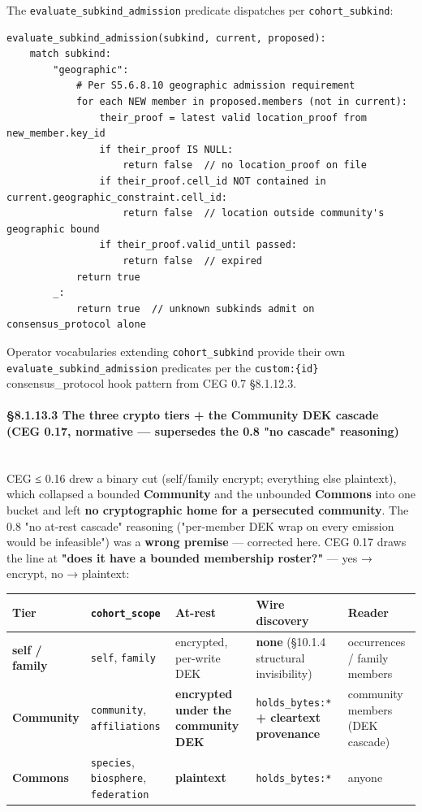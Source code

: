 \documentclass[11pt]{article}
\begin{document}
The \texttt{evaluate\_subkind\_admission} predicate dispatches per \texttt{cohort\_subkind}:


\begin{lstlisting}
evaluate_subkind_admission(subkind, current, proposed):
    match subkind:
        "geographic":
            # Per S5.6.8.10 geographic admission requirement
            for each NEW member in proposed.members (not in current):
                their_proof = latest valid location_proof from new_member.key_id
                if their_proof IS NULL:
                    return false  // no location_proof on file
                if their_proof.cell_id NOT contained in current.geographic_constraint.cell_id:
                    return false  // location outside community's geographic bound
                if their_proof.valid_until passed:
                    return false  // expired
            return true
        _:
            return true  // unknown subkinds admit on consensus_protocol alone
\end{lstlisting}

Operator vocabularies extending \texttt{cohort\_subkind} provide their own \texttt{evaluate\_subkind\_admission} predicates per the \texttt{custom:\{id\}} consensus\_protocol hook pattern from CEG 0.7 §8.1.12.3.


\paragraph{§8.1.13.3 The three crypto tiers + the Community DEK cascade (CEG 0.17, normative — supersedes the 0.8 "no cascade" reasoning)}\mbox{}\\


CEG ≤ 0.16 drew a binary cut (self/family encrypt; everything else plaintext), which collapsed a bounded \textbf{Community} and the unbounded \textbf{Commons} into one bucket and left \textbf{no cryptographic home for a persecuted community}. The 0.8 "no at-rest cascade" reasoning ("per-member DEK wrap on every emission would be infeasible") was a \textbf{wrong premise} — corrected here. CEG 0.17 draws the line at \textbf{"does it have a bounded membership roster?"} — yes → encrypt, no → plaintext:


{\scriptsize
\begin{longtable}{|p{3.2cm}|p{3.2cm}|p{3.2cm}|p{3.2cm}|p{3.2cm}|}\hline
\textbf{Tier} & \textbf{\texttt{cohort\_scope}} & \textbf{At-rest} & \textbf{Wire discovery} & \textbf{Reader} \\ \hline\endhead
\textbf{self / family} & \texttt{self}, \texttt{family} & encrypted, per-write DEK & \textbf{none} (§10.1.4 structural invisibility) & occurrences / family members \\ \hline
\textbf{Community} & \texttt{community}, \texttt{affiliations} & \textbf{encrypted under the community DEK} & \texttt{holds\_bytes:*} \textbf{+ cleartext provenance} & community members (DEK cascade) \\ \hline
\textbf{Commons} & \texttt{species}, \texttt{biosphere}, \texttt{federation} & \textbf{plaintext} & \texttt{holds\_bytes:*} & anyone \\ \hline
\end{longtable}}
\end{document}
